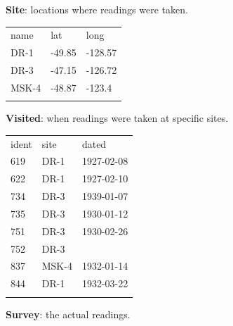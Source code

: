 \documentclass{book}
\begin{document}
\textbf{Site}: locations where readings were taken.

\begin{tabular}{@{}lll@{}}
\hline\noalign{\medskip}
name & lat & long
\\\noalign{\medskip}
\hline\noalign{\medskip}
DR-1 & -49.85 & -128.57
\\\noalign{\medskip}
DR-3 & -47.15 & -126.72
\\\noalign{\medskip}
MSK-4 & -48.87 & -123.4
\\\noalign{\medskip}
\hline
\end{tabular}

\textbf{Visited}: when readings were taken at specific sites.

\begin{tabular}{@{}lll@{}}
\hline\noalign{\medskip}
ident & site & dated
\\\noalign{\medskip}
\hline\noalign{\medskip}
619 & DR-1 & 1927-02-08
\\\noalign{\medskip}
622 & DR-1 & 1927-02-10
\\\noalign{\medskip}
734 & DR-3 & 1939-01-07
\\\noalign{\medskip}
735 & DR-3 & 1930-01-12
\\\noalign{\medskip}
751 & DR-3 & 1930-02-26
\\\noalign{\medskip}
752 & DR-3 & ~
\\\noalign{\medskip}
837 & MSK-4 & 1932-01-14
\\\noalign{\medskip}
844 & DR-1 & 1932-03-22
\\\noalign{\medskip}
\hline
\end{tabular}

\textbf{Survey}: the actual readings.
\end{document}
